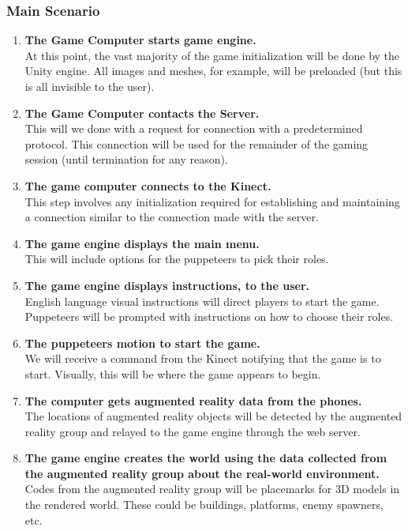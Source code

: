 \documentclass[10pt,letterpaper,oneside,english]{article}
\begin{document}
\subsubsection{Main Scenario}
\begin{enumerate}
\item \textbf{The Game Computer starts game engine.} \\ At this point, the vast majority of the game initialization will be done by the Unity engine. All images and meshes, for example, will be preloaded (but this is all invisible to the user).
\item \textbf{The Game Computer contacts the Server.} \\ This will we done with a request for connection with a predetermined protocol. This connection will be used for the remainder of the gaming session (until termination for any reason).
\item \textbf{The game computer connects to the Kinect.} \\ This step involves any initialization required for establishing and maintaining a connection similar to the connection made with the server.
\item \textbf{The game engine displays the main menu.} \\ This will include options for the puppeteers to pick their roles.
\item \textbf{The game engine displays instructions, to the user.} \\ English language visual instructions will direct players to start the game. Puppeteers will be prompted with instructions on how to choose their roles.
\item \textbf{The puppeteers motion to start the game.} \\ We will receive a command from the Kinect notifying that the game is to start. Visually, this will be where the game appears to begin.
\item \textbf{The computer gets augmented reality data from the phones.} \\ The locations of augmented reality objects will be detected by the augmented reality group and relayed to the game engine through the web server.
\item \textbf{The game engine creates the world using the data collected from the augmented reality group about the real-world environment.} \\ Codes from the augmented reality group will be placemarks for 3D models in the rendered world. These could be buildings, platforms, enemy spawners, etc.

\end{enumerate}
\end{document}
